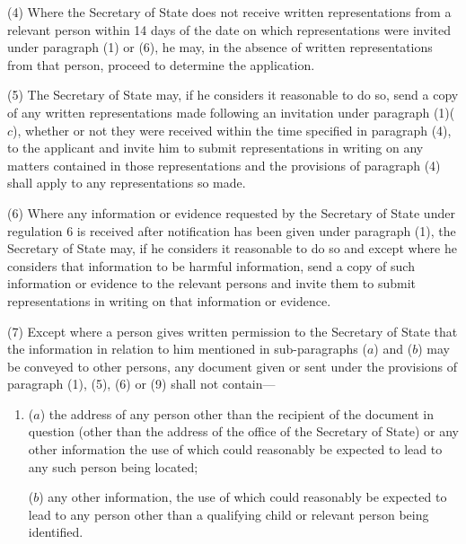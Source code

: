 \documentclass[a4paper]{article}
\begin{document}
(4) Where the Secretary of State does not receive written representations from a relevant person within 14 days of the date on which representations were invited under paragraph (1) or (6), he may, in the absence of written representations from that person, proceed to determine the application.

(5) The Secretary of State may, if he considers it reasonable to do so, send a copy of any written representations made following an invitation under paragraph (1)($c$), whether or not they were received within the time specified in paragraph (4), to the applicant and invite him to submit representations in writing on any matters contained in those representations and the provisions of paragraph (4) shall apply to any representations so made.

(6) Where any information or evidence requested by the Secretary of State under regulation 6 is received after notification has been given under paragraph (1), the Secretary of State may, if he considers it reasonable to do so and except where he considers that information to be harmful information, send a copy of such information or evidence to the relevant persons and invite them to submit representations in writing on that information or evidence.

(7) Except where a person gives written permission to the Secretary of State that the information in relation to him mentioned in sub-paragraphs ($a$) and ($b$) may be conveyed to other persons, any document given or sent under the provisions of paragraph (1), (5), (6) or (9) shall not contain—
\begin{enumerate}\item[]
($a$) the address of any person other than the recipient of the document in question (other than the address of the office of the Secretary of State) or any other information the use of which could reasonably be expected to lead to any such person being located;

($b$) any other information, the use of which could reasonably be expected to lead to any person other than a qualifying child or relevant person being identified.
\end{enumerate}
\end{document}
